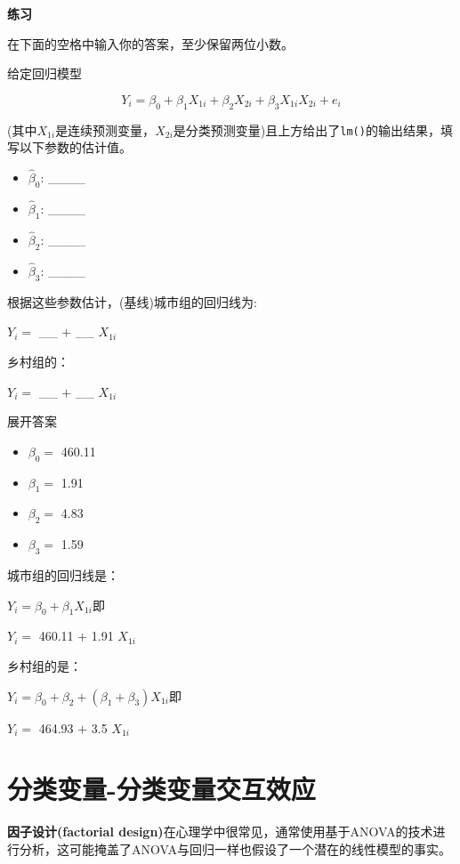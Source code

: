\documentclass[
]{book}
\providecommand{\tightlist}{%
  \setlength{\itemsep}{0pt}\setlength{\parskip}{0pt}}
\begin{document}
\textbf{练习}

在下面的空格中输入你的答案，至少保留两位小数。

给定回归模型

\[Y_{i} = \beta_0 + \beta_1 X_{1i} + \beta_2 X_{2i} + \beta_3 X_{1i} X_{2i} + e_{i}\]

(其中\(X_{1i}\)是连续预测变量，\(X_{2i}\)是分类预测变量)且上方给出了\texttt{lm()}的输出结果，填写以下参数的估计值。

\begin{itemize}
\tightlist
\item
  \(\hat{\beta}_0\): \_\_\_\_
\item
  \(\hat{\beta}_1\): \_\_\_\_
\item
  \(\hat{\beta}_2\): \_\_\_\_
\item
  \(\hat{\beta}_3\): \_\_\_\_
\end{itemize}

根据这些参数估计，(基线)城市组的回归线为:

\(Y_i =\) \_\_ \(+\) \_\_ \(X_{1i}\)

乡村组的：

\(Y_i =\) \_\_ \(+\) \_\_ \(X_{1i}\)

展开答案

\begin{itemize}
\tightlist
\item
  \(\beta_0=\) 460.11
\item
  \(\beta_1=\) 1.91
\item
  \(\beta_2=\) 4.83
\item
  \(\beta_3=\) 1.59
\end{itemize}

城市组的回归线是：

\(Y_i = \beta_0 + \beta_1 X_{1i}\)即

\(Y_i =\) 460.11 \(+\) 1.91 \(X_{1i}\)

乡村组的是：

\(Y_i = \beta_0 + \beta_2 + \left(\beta_1 + \beta_3\right) X_{1i}\)即

\(Y_i=\) 464.93 \(+\) 3.5 \(X_{1i}\)

\hypertarget{ux5206ux7c7bux53d8ux91cf-ux5206ux7c7bux53d8ux91cfux4ea4ux4e92ux6548ux5e94}{%
\section{分类变量-分类变量交互效应}\label{ux5206ux7c7bux53d8ux91cf-ux5206ux7c7bux53d8ux91cfux4ea4ux4e92ux6548ux5e94}}

\textbf{因子设计(factorial design)}在心理学中很常见，通常使用基于ANOVA的技术进行分析，这可能掩盖了ANOVA与回归一样也假设了一个潜在的线性模型的事实。
\end{document}
